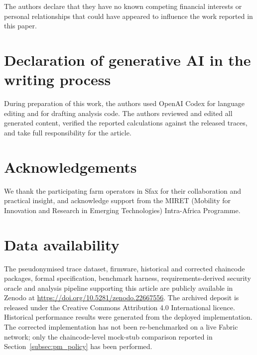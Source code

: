 \documentclass[a4paper,fleqn]{cas-sc}
\begin{document}
The authors declare that they have no known competing financial interests or
personal relationships that could have appeared to influence the work
reported in this paper.

\section*{Declaration of generative AI in the writing process}

During preparation of this work, the authors used OpenAI Codex for language
editing and for drafting analysis code. The authors reviewed and edited all
generated content, verified the reported calculations against the released
traces, and take full responsibility for the article.

\section*{Acknowledgements}

We thank the participating farm operators in Sfax for their collaboration and
practical insight, and acknowledge support from the MIRET (Mobility for
Innovation and Research in Emerging Technologies) Intra-Africa Programme.

\section*{Data availability}

The pseudonymised trace dataset, firmware, historical and corrected
chaincode packages, formal specification, benchmark harness,
requirements-derived security oracle and analysis pipeline supporting this
article are publicly available in Zenodo at
\url{https://doi.org/10.5281/zenodo.22667556}. The archived deposit is
released under the Creative Commons Attribution 4.0 International licence.
Historical performance results were generated from the deployed
implementation. The corrected implementation has not been re-benchmarked
on a live Fabric network; only the chaincode-level mock-stub comparison
reported in Section~\ref{subsec:pm_policy} has been performed.

\clearpage


\end{document}
